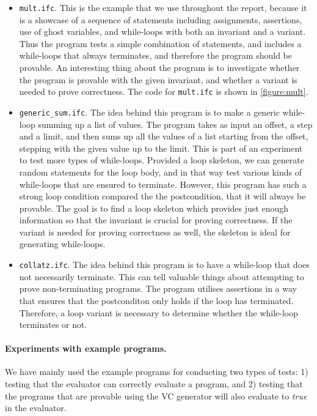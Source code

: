 \begin{itemize}
  \item {\texttt{mult.ifc}.} 
  This is the example that we use throughout the report, because it is a showcase of a sequence of statements including assignments, assertions, use of ghost variables, and while-loops with both an invariant and a variant.
  Thus the program tests a simple combination of statements, and includes a while-loops that always terminates, and therefore the program should be provable.
  An interesting thing about the program is to investigate whether the program is provable with the given invariant, and whether a variant is needed to prove correctness.
  The code for \texttt{mult.ifc} is shown in \autoref{figure:mult}.
  
  \item{\texttt{generic\_sum.ifc}.}
  The idea behind this program is to make a generic while-loop summing up a list of values. 
  The program takes as input an offset, a step and a limit, and then sums up all the values of a list starting from the offset, stepping with the given value up to the limit.
  This is part of an experiment to test more types of while-loops. Provided a loop skeleton, we can generate random statements for the loop body, and in that way test various kinds of while-loops that are ensured to terminate.
  However, this program has such a strong loop condition compared the the postcondition, that it will always be provable.
  The goal is to find a loop skeleton which provides just enough information so that the invariant is crucial for proving correctness. If the variant is needed for proving correctness as well, the skeleton is ideal for generating while-loops.
  
  \item{\texttt{collatz.ifc}.}
  The idea behind this program is to have a while-loop that does not necessarily terminate.
  This can tell valuable things about attempting to prove non-terminating programs.
  The program utilises assertions in a way that ensures that the postconditon only holds if the loop has terminated.
  Therefore, a loop variant is necessary to determine whether the while-loop terminates or not.
\end{itemize}

\paragraph{Experiments with example programs.}
We have mainly used the example programs for conducting two types of tests: 1) testing that the evaluator can correctly evaluate a program, and 2) testing that the programs that are provable using the VC generator will also evaluate to \textit{true} in the evaluator.


